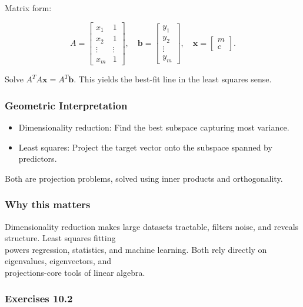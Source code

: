 \documentclass[
  12pt,
  a4paper,
]{article}
\begin{document}
Matrix form:

\[A = \begin{bmatrix}
x_1 & 1 \\
x_2 & 1 \\
\vdots & \vdots \\
x_m & 1
\end{bmatrix},
\quad
\mathbf{b} =
\begin{bmatrix}
y_1 \\
y_2 \\
\vdots \\
y_m \end{bmatrix},
\quad
\mathbf{x} =
\begin{bmatrix}
m \\
c \end{bmatrix}.\]

Solve \(A^T A \mathbf{x} = A^T \mathbf{b}\). This yields the best-fit
line in the least squares sense.

\subsubsection{Geometric
Interpretation}\label{geometric-interpretation-24}

\begin{itemize}
\item
  Dimensionality reduction: Find the best subspace capturing most
  variance.
\item
  Least squares: Project the target vector onto the subspace spanned by
  predictors.
\end{itemize}

Both are projection problems, solved using inner products and
orthogonality.

\subsubsection{Why this matters}\label{why-this-matters-37}

Dimensionality reduction makes large datasets tractable, filters noise,
and reveals structure. Least squares fitting\\
powers regression, statistics, and machine learning. Both rely directly
on eigenvalues, eigenvectors, and\\
projections-core tools of linear algebra.

\subsubsection{Exercises 10.2}\label{exercises-102}
\end{document}
